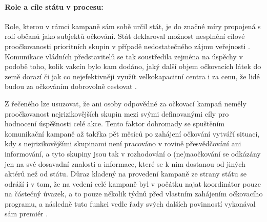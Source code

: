 \paragraph{Role a cíle státu v procesu:} Role, kterou v rámci kampaně sám sobě určil stát, je do značné míry propojená s rolí občanů jako subjektů očkování. Stát deklaroval možnost nesplnění cílové proočkovanosti prioritních skupin v případě nedostatečného zájmu veřejnosti \cite{kdoprvni}. Komunikace vládních představitelů se tak soustředila zejména na úspěchy v podobě toho, kolik vakcín bylo kam dodáno, jaký další objem očkovacích látek do země dorazí či jak co nejefektivněji využít velkokapacitní centra i za cenu, že lidé budou za očkováním dobrovolně cestovat \cite{babis_echo}.

Z řečeného lze usuzovat, že ani osoby odpovědné za očkovací kampaň neměly proočkovanost nejrizikovějších skupin mezi svými definovanými cíly pro hodnocení úspěšnosti celé akce. Tento faktor dohromady 
se spuštěním komunikační kampaně až takřka pět měsíců po zahájení očkování \cite{logoc_naruby,logoc_zpozdeni} vytváří situaci, kdy s nejrizikovějšími skupinami není pracováno v rovině přesvědčování ani informování, a tyto skupiny jsou tak v rozhodování o (ne)naočkování se odkázány jen na své dosavadní znalosti a informace, které se k nim dostanou od jiných aktérů než od státu. Důraz kladený na provedení kampaně ze strany státu se odráží i v tom, že na vedení celé kampaně byl v počátku najat koordinátor pouze na částečný úvazek, a to pouze několik týdnů před vlastním zahájením očkovacího programu, a následně tuto funkci vedle řady svých dalších povinností vykonával sám premiér \cite{ocko_blahuta,babis_koordinator}. %




